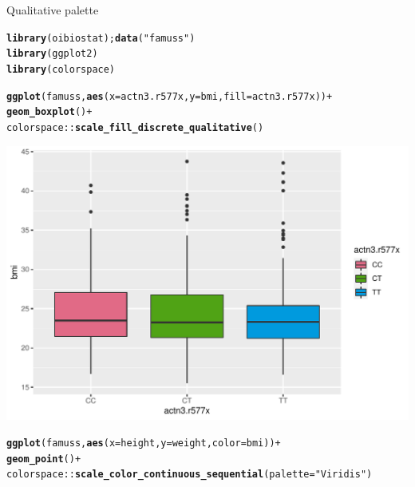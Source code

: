 \documentclass[10pt,handout]{beamer}\usepackage[]{graphicx}\usepackage[]{color}
\makeatletter
\def\maxwidth{ %
  \ifdim\Gin@nat@width>\linewidth
    \linewidth
  \else
    \Gin@nat@width
  \fi
}
\newcommand{\hlstr}[1]{\textcolor[rgb]{0.192,0.494,0.8}{#1}}%
\newcommand{\hlopt}[1]{\textcolor[rgb]{0,0,0}{#1}}%
\newcommand{\hlstd}[1]{\textcolor[rgb]{0.345,0.345,0.345}{#1}}%
\newcommand{\hlkwc}[1]{\textcolor[rgb]{0.333,0.667,0.333}{#1}}%
\newcommand{\hlkwd}[1]{\textcolor[rgb]{0.737,0.353,0.396}{\textbf{#1}}}%
\newenvironment{kframe}{%
 \def\at@end@of@kframe{}%
 \ifinner\ifhmode%
  \def\at@end@of@kframe{\end{minipage}}%
  \begin{minipage}{\columnwidth}%
 \fi\fi%
 \def\FrameCommand##1{\hskip\@totalleftmargin \hskip-\fboxsep
 \colorbox{shadecolor}{##1}\hskip-\fboxsep
     \hskip-\linewidth \hskip-\@totalleftmargin \hskip\columnwidth}%
 \MakeFramed {\advance\hsize-\width
   \@totalleftmargin\z@ \linewidth\hsize
   \@setminipage}}%
 {\par\unskip\endMakeFramed%
 \at@end@of@kframe}
\newenvironment{knitrout}{}{} %
\makeatother
\begin{document}
\begin{frame}[fragile]{Qualitative palette}
\begin{knitrout}\tiny
{}\color{fgcolor}\begin{kframe}
\begin{alltt}
\hlkwd{library}\hlstd{(oibiostat);} \hlkwd{data}\hlstd{(}\hlstr{"famuss"}\hlstd{)}
\hlkwd{library}\hlstd{(ggplot2)}
\hlkwd{library}\hlstd{(colorspace)}

\hlkwd{ggplot}\hlstd{(famuss,} \hlkwd{aes}\hlstd{(}\hlkwc{x} \hlstd{= actn3.r577x,} \hlkwc{y} \hlstd{= bmi,} \hlkwc{fill} \hlstd{= actn3.r577x))} \hlopt{+}
  \hlkwd{geom_boxplot}\hlstd{()} \hlopt{+}
  \hlstd{colorspace}\hlopt{::}\hlkwd{scale_fill_discrete_qualitative}\hlstd{()}
\end{alltt}
\end{kframe}

{\centering \includegraphics[width=\maxwidth]{figure/unnamed-chunk-1-1} 

}


\begin{kframe}\begin{alltt}
\hlkwd{ggplot}\hlstd{(famuss,} \hlkwd{aes}\hlstd{(}\hlkwc{x} \hlstd{= height,} \hlkwc{y} \hlstd{= weight,} \hlkwc{color} \hlstd{= bmi))} \hlopt{+}
  \hlkwd{geom_point}\hlstd{()} \hlopt{+}
  \hlstd{colorspace}\hlopt{::}\hlkwd{scale_color_continuous_sequential}\hlstd{(}\hlkwc{palette} \hlstd{=} \hlstr{"Viridis"}\hlstd{)}
\end{alltt}
\end{kframe}


\end{knitrout}
\end{frame}
\end{document}
